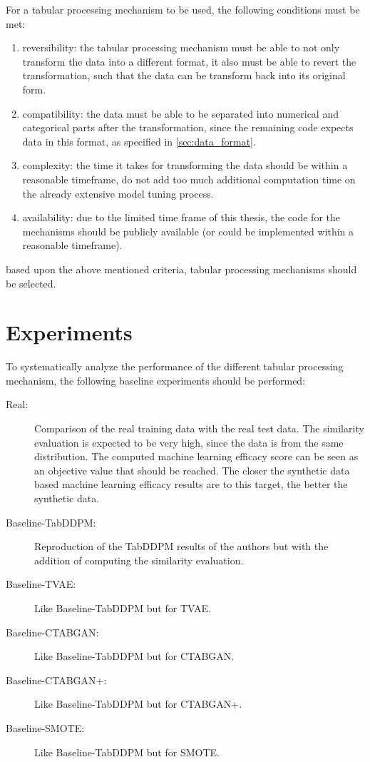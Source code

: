 For a tabular processing mechanism to be used, the following conditions must be met:

\begin{enumerate}
    \item reversibility: the tabular processing mechanism must be able to not only transform the data into a different format, it also must be able to revert the transformation,
    such that the data can be transform back into its original form.
    \item compatibility: the data must be able to be separated into numerical and categorical parts after the transformation,
    since the remaining code expects data in this format, as specified in \autoref{sec:data_format}.
    \item complexity: the time it takes for transforming the data should be within a reasonable timeframe, do not add too much additional computation time on the already extensive model tuning process.
    \item availability: due to the limited time frame of this thesis, the code for the mechanisms should be publicly available (or could be implemented within a reasonable timeframe).
\end{enumerate}

based upon the above mentioned criteria, tabular processing mechanisms should be selected.

\section{Experiments}
\label{ch:conceptualDesign-Experiments}

To systematically analyze the performance of the different tabular processing mechanism, the following baseline experiments should be performed:

\begin{description}
    \item[Real:] Comparison of the real training data with the real test data. 
    The similarity evaluation is expected to be very high, since the data is from the same distribution.
    The computed machine learning efficacy score can be seen as an objective value that should be reached.
    The closer the synthetic data based machine learning efficacy results are to this target, the better the synthetic data.
    \item[Baseline-TabDDPM:] Reproduction of the TabDDPM results of the authors \cite{kotelnikov2022TabDDPMModellingTabular} but with the addition of computing the similarity evaluation.
    \item[Baseline-TVAE:] Like Baseline-TabDDPM but for TVAE.
    \item[Baseline-CTABGAN:] Like Baseline-TabDDPM but for CTABGAN.
    \item[Baseline-CTABGAN+:] Like Baseline-TabDDPM but for CTABGAN+.
    \item[Baseline-SMOTE:] Like Baseline-TabDDPM but for SMOTE.
\end{description}

